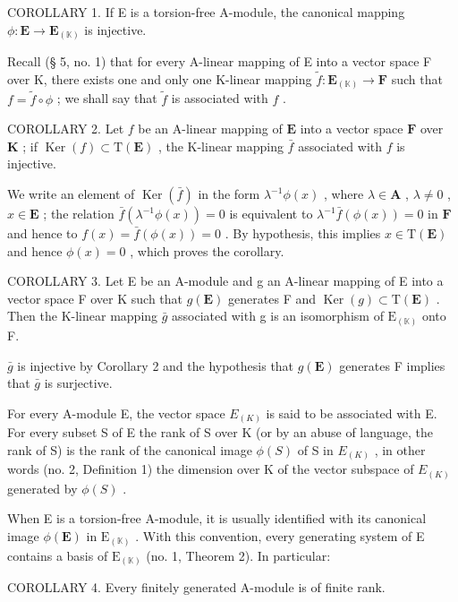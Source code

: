 COROLLARY 1. If E is a torsion-free A-module, the canonical mapping \(\phi: \mathbf{E} \to \mathbf{E}_{(\mathbb{K})}\) is injective.

Recall (§ 5, no. 1) that for every A-linear mapping of E into a vector space F over K, there exists one and only one K-linear mapping \(\tilde{f}\colon\mathbf{E}_{(\mathbb{K})}\to\mathbf{F}\) such that \(f=\tilde{f}\circ\phi\) ; we shall say that \(\tilde{f}\) is associated with \(f\) .

COROLLARY 2. Let \(f\) be an A-linear mapping of \(\mathbf{E}\) into a vector space \(\mathbf{F}\) over \(\mathbf{K}\) ; if \(\operatorname{Ker}(f) \subset \mathrm{T}(\mathbf{E})\) , the K-linear mapping \(\bar{f}\) associated with \(f\) is injective.

We write an element of \(\operatorname{Ker}(\bar{f})\) in the form \(\lambda^{-1}\phi(x)\) , where \(\lambda \in \mathbf{A}\) , \(\lambda \neq 0\) , \(x \in \mathbf{E}\) ; the relation \(\bar{f}(\lambda^{-1}\phi(x)) = 0\) is equivalent to \(\lambda^{-1}\bar{f}(\phi(x)) = 0\) in \(\mathbf{F}\) and hence to \(f(x) = \bar{f}(\phi(x)) = 0\) . By hypothesis, this implies \(x \in \mathrm{T}(\mathbf{E})\) and hence \(\phi(x) = 0\) , which proves the corollary.

COROLLARY 3. Let E be an A-module and g an A-linear mapping of E into a vector space F over K such that \(g(\mathbf{E})\) generates F and \(\operatorname{Ker}(g) \subset \mathrm{T}(\mathbf{E})\) . Then the K-linear mapping \(\bar{g}\) associated with g is an isomorphism of \(\mathrm{E}_{(\mathbb{K})}\) onto F.

\(\bar{g}\) is injective by Corollary 2 and the hypothesis that \(g(\mathbf{E})\) generates F implies that \(\bar{g}\) is surjective.

For every A-module E, the vector space \(E_{(K)}\) is said to be associated with E. For every subset S of E the rank of S over K (or by an abuse of language, the rank of S) is the rank of the canonical image \(\phi(S)\) of S in \(E_{(K)}\) , in other words (no. 2, Definition 1) the dimension over K of the vector subspace of \(E_{(K)}\) generated by \(\phi(S)\) .

When E is a torsion-free A-module, it is usually identified with its canonical image \(\phi(\mathbf{E})\) in \(\mathrm{E}_{(\mathbb{K})}\) . With this convention, every generating system of E contains a basis of \(\mathrm{E}_{(\mathbb{K})}\) (no. 1, Theorem 2). In particular:

COROLLARY 4. Every finitely generated A-module is of finite rank.

